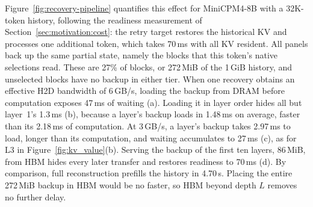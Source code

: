 Figure~\ref{fig:recovery-pipeline} quantifies this effect for MiniCPM4-8B
with a 32K-token history, following the readiness measurement of
Section~\ref{sec:motivation:cost}: the retry target restores the
historical KV and processes one additional token, which takes 70\,ms
with all KV resident. All panels back up the same partial state, namely
the blocks that this token's native selections read. These are 27\% of
blocks, or 272\,MiB of the 1\,GiB history, and unselected blocks have no
backup in either tier. When one recovery obtains an effective H2D
bandwidth of 6\,GB/s, loading the backup from DRAM before computation
exposes 47\,ms of waiting (a). Loading it in layer order hides all but
layer~1's 1.3\,ms (b), because a layer's backup loads in 1.48\,ms on
average, faster than its 2.18\,ms of computation. At 3\,GB/s, a layer's
backup takes 2.97\,ms to load, longer than its computation, and waiting
accumulates to 27\,ms (c), as for L3 in Figure~\ref{fig:kv_value}(b).
Serving the backup of the first ten layers, 86\,MiB, from HBM hides
every later transfer and restores readiness to 70\,ms (d). By
comparison, full reconstruction prefills the history in 4.70\,s. Placing
the entire 272\,MiB backup in HBM would be no faster, so HBM beyond
depth $L$ removes no further delay.

